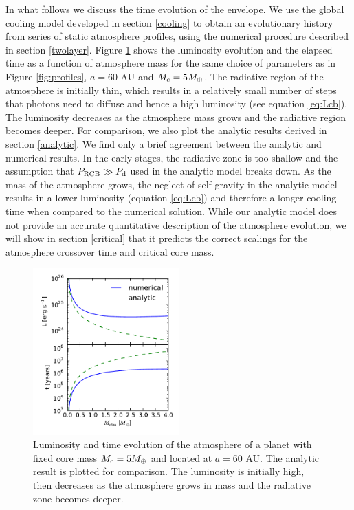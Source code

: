 \documentclass[apj]{emulateapj}
\begin{document}

In what follows we discuss the time evolution of the envelope. We use the global cooling model developed in section \ref{cooling} to obtain an evolutionary history from series of static atmosphere profiles, using the numerical procedure described in section \ref{twolayer}. Figure \ref{fig:Ltplot} shows the luminosity evolution and the elapsed time as a function of atmosphere mass for the same choice of parameters as in Figure \ref{fig:profiles}, $a=60$ AU and $M_{\rm c}=5 M_{\oplus}$. The radiative region of the atmosphere is initially thin, which results in a relatively small number of steps that photons need to diffuse and hence a high luminosity (see equation \ref{eq:Lcb}). The luminosity decreases as the atmosphere mass grows and the radiative region becomes deeper. For comparison, we also plot the analytic results derived in section \ref{analytic}. We find only a brief agreement between the analytic and numerical results. In the early stages, the radiative zone is too shallow and the assumption that $P_{\rm RCB} \gg P_{\rm d}$ used in the analytic model breaks down. As the mass of the atmosphere grows, the neglect of self-gravity in the analytic model results in a lower luminosity (equation \ref{eq:Lcb}) and therefore a longer cooling time when compared to the numerical solution. While our analytic model does not provide an accurate quantitative description of the atmosphere evolution, we will show in section \ref{critical} that it predicts the correct scalings for the atmosphere crossover time and critical core mass.  %

\begin{figure}[h]
\centering
\includegraphics[width=0.5\textwidth]{../../figs/ModelAtmospheres/RadSelfGravPoly/PaperFigs/Lt_profiles_v2.pdf}
\caption{Luminosity and time evolution of the atmosphere of a planet with fixed core mass $M_{\rm c}=5 M_{\oplus}$ and located at $a=60$ AU. The analytic result is plotted for comparison. The luminosity is initially high, then decreases as the atmosphere grows in mass and the radiative zone becomes deeper.}
\label{fig:Ltplot}
\end{figure}
\end{document}
